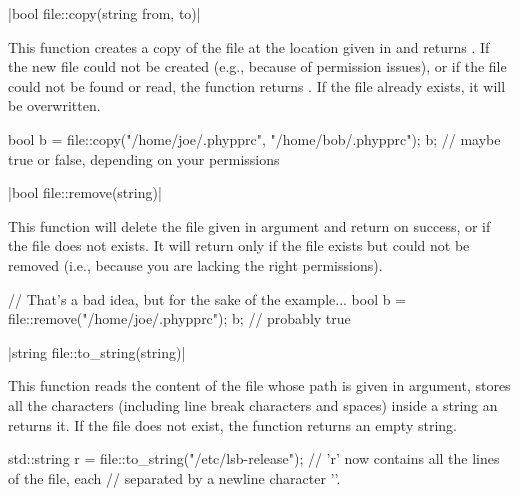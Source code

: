 \funcitem \cppinline|bool file::copy(string from, to)| 

This function creates a copy of the file  at the location given in  and returns \cpptrue. If the new file could not be created (e.g., because of permission issues), or if the file  could not be found or read, the function returns \cppfalse. If the file  already exists, it will be overwritten.

\begin{example}
\begin{cppcode}
bool b = file::copy("/home/joe/.phypprc", "/home/bob/.phypprc");
b; // maybe true or false, depending on your permissions
\end{cppcode}
\end{example}

\funcitem \cppinline|bool file::remove(string)| 

This function will delete the file given in argument and return \cpptrue on success, or if the file does not exists. It will return \cppfalse only if the file exists but could not be removed (i.e., because you are lacking the right permissions).

\begin{example}
\begin{cppcode}
// That's a bad idea, but for the sake of the example...
bool b = file::remove("/home/joe/.phypprc");
b; // probably true
\end{cppcode}
\end{example}

\funcitem \cppinline|string file::to_string(string)| 

This function reads the content of the file whose path is given in argument, stores all the characters (including line break characters and spaces) inside a string an returns it. If the file does not exist, the function returns an empty string.

\begin{example}
\begin{cppcode}
std::string r = file::to_string("/etc/lsb-release");
// 'r' now contains all the lines of the file, each
// separated by a newline character '\n'.
\end{cppcode}
\end{example}
